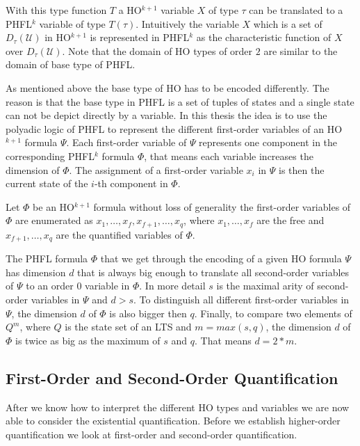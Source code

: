 With this type function $T$ a HO$^{k + 1}$ variable $X$ of type $\tau$ can be translated to a PHFL$^k$ variable
of type $T(\tau)$. Intuitively the variable $X$ which is a set of $D_\tau(\mathcal{U})$ in HO$^{k+1}$ is represented
in PHFL$^k$ as the characteristic function of $X$ over $D_\tau(\mathcal{U})$. Note that the domain of HO types
of order $2$ are similar to the domain of base type of PHFL.

As mentioned above the base type of HO has to be encoded differently. The reason is that the base type in PHFL is a
set of tuples of states and a single state can not be depict directly by a variable. In this thesis the
idea is to use the polyadic logic of PHFL to represent the different first-order variables of an HO$^{k+1}$ formula
$\Psi$. Each first-order variable of $\Psi$ represents one component in the corresponding PHFL$^k$ formula $\Phi$, that
means each variable increases the dimension of $\Phi$. The assignment of a first-order variable $x_i$ in $\Psi$ is
then the current state of the $i$-th component in $\Phi$.

Let $\Phi$ be an HO$^{k+1}$ formula without loss of generality the first-order variables of $\Phi$ are enumerated as
$x_1, \dots, x_f, x_{f + 1}, \dots, x_q$, where $x_1, \dots, x_f$ are the free and $x_{f+1}, \dots, x_q$ are the
quantified variables of $\Phi$.

\begin{remark}
    The PHFL formula $\Phi$ that we get through the encoding of a given HO formula $\Psi$ has dimension
    $d$ that is always big enough to translate all second-order variables of $\Psi$ to an order $0$ variable in
    $\Phi$. In more detail $s$ is the maximal arity of second-order variables in $\Psi$ and $d > s$. To distinguish all
    different first-order variables in $\Psi$, the dimension $d$ of $\Phi$ is also bigger then $q$.  Finally, to compare
    two
    elements of $Q^{m}$, where $Q$ is the state set of an LTS and $m = max({s, q})$, the dimension $d$ of $\Phi$ is
    twice as big as the maximum of $s$ and $q$. That means $d = 2 * m$.
\end{remark}

\subsection{First-Order and Second-Order Quantification}\label{subsec:existentialQuantifiers}

After we know how to interpret the different HO types and variables we are now able to consider the existential
quantification. Before we establish higher-order quantification we look at first-order and second-order quantification.

